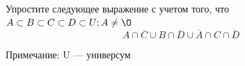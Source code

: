 \question
Упростите следующее выражение с учетом того, что $A\subset B \subset C \subset D \subset U; A \neq \O$
\begin{equation*}
A \cap  \overline{C} \cup B \cap \overline{D} \cup  \overline{A} \cap C \cap  \overline{D}
\end{equation*}

Примечание: U — универсум